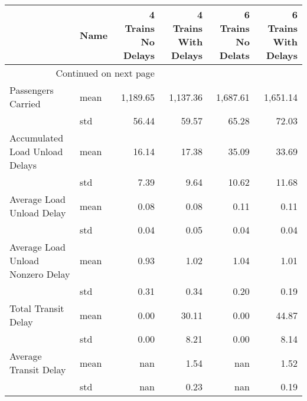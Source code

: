 \begin{longtable}{llrrrr}
\toprule
                    & Name &  4 Trains No Delays &  4 Trains With Delays &  6 Trains No Delats &  6 Trains With Delays \\
\midrule
\endhead
\midrule
\multicolumn{3}{r}{{Continued on next page}} \\
\midrule
\endfoot

\bottomrule
\endlastfoot
 Passengers Carried & mean &            1,189.65 &              1,137.36 &            1,687.61 &              1,651.14 \\
                    & std &               56.44 &                 59.57 &               65.28 &                 72.03 \\
 Accumulated Load Unload Delays & mean &               16.14 &                 17.38 &               35.09 &                 33.69 \\
                    & std &                7.39 &                  9.64 &               10.62 &                 11.68 \\
 Average Load Unload Delay & mean &                0.08 &                  0.08 &                0.11 &                  0.11 \\
                    & std &                0.04 &                  0.05 &                0.04 &                  0.04 \\
 Average Load Unload Nonzero Delay & mean &                0.93 &                  1.02 &                1.04 &                  1.01 \\
                    & std &                0.31 &                  0.34 &                0.20 &                  0.19 \\
 Total Transit Delay & mean &                0.00 &                 30.11 &                0.00 &                 44.87 \\
                    & std &                0.00 &                  8.21 &                0.00 &                  8.14 \\
 Average Transit Delay & mean &                 nan &                  1.54 &                 nan &                  1.52 \\
                    & std &                 nan &                  0.23 &                 nan &                  0.19 \\
\end{longtable}
